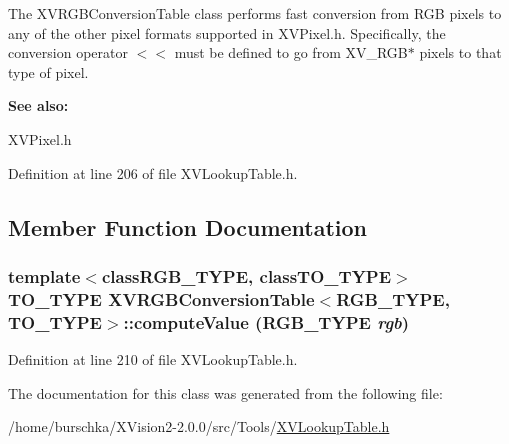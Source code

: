 The XVRGBConversion\-Table class performs fast conversion from RGB pixels to any of the other pixel formats supported in XVPixel.h. Specifically, the conversion operator $<$$<$ must be defined to go from XV\_\-RGB$\ast$ pixels to that type of pixel.

\begin{Desc}
\item[{\bf See also: }]\par
 XVPixel.h \end{Desc}




Definition at line 206 of file XVLookup\-Table.h.

\subsection{Member Function Documentation}
\label{XVRGBConversionTable_b0}
\hypertarget{class_XVRGBConversionTable_b0}{
\subsubsection[computeValue]{\setlength{\rightskip}{0pt plus 5cm}template$<$classRGB\_\-TYPE, classTO\_\-TYPE$>$ TO\_\-TYPE XVRGBConversion\-Table$<$RGB\_\-TYPE, TO\_\-TYPE$>$::compute\-Value (RGB\_\-TYPE {\em rgb})}}




Definition at line 210 of file XVLookup\-Table.h.

The documentation for this class was generated from the following file:\begin{CompactItemize}
\item 
/home/burschka/XVision2-2.0.0/src/Tools/\hyperlink{XVLookupTable.h-source}{XVLookup\-Table.h}\end{CompactItemize}
